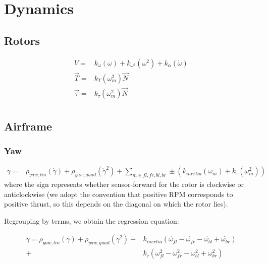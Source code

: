 \documentclass{article}
\begin{document}
\section{Dynamics}

\subsection{Rotors}

\begin{equation}
\begin{aligned}
    V =& k_{\omega}(\omega) + k_{\omega^2}(\omega^2) + k_{\alpha}(\dot{\omega})\\
    \vec{T} =& k_T(\omega_m^2)\vec{N}\\
    \vec{\tau} =& k_{\tau}(\omega_m^2)\vec{N}\\
\end{aligned}
\end{equation}

\subsection{Airframe}

\subsubsection{Yaw}
\begin{equation}
\begin{aligned}
    \ddot{\gamma} =& \rho_{yaw,lin}(\dot{\gamma}) + \rho_{yaw,quad}(\dot{\gamma}^2) + \sum_{m \in fl, fr, bl, br} \pm \left(k_{inertia} (\dot{\omega_{m}}) + k_\tau(\omega_{m}^2)\right)
\end{aligned}
\end{equation}
where the sign represents whether sensor-forward for the rotor is clockwise or anticlockwise (we adopt the convention that positive RPM corresponds to positive thrust, so this depends on the diagonal on which the rotor lies).

Regrouping by terms, we obtain the regression equation:

\begin{equation}
\begin{aligned}
    \ddot{\gamma} = \rho_{yaw,lin}(\dot{\gamma}) + \rho_{yaw,quad}(\dot{\gamma}^2) +& k_{inertia}(\dot{\omega_{fl}} - \dot{\omega_{fr}} - \dot{\omega_{bl}} + \dot{\omega_{br}})\\
    +& k_\tau(\omega_{fl}^2 - \omega_{fr}^2 - \omega_{bl}^2 + \omega_{br}^2)
\end{aligned}
\end{equation}
\end{document}
